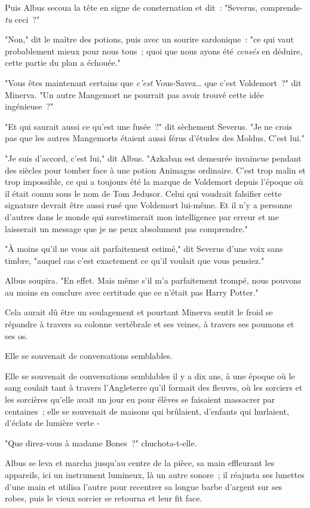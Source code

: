 Puis Albus secoua la tête en signe de consternation et dit~: "Severus, comprends-\emph{tu} ceci~?"

"Non," dit le maître des potions, puis avec un sourire sardonique~: "ce qui vaut probablement mieux pour nous tous~; quoi que nous ayons été \emph{censés} en déduire, cette partie du plan a échouée."

"Vous êtes maintenant certains que \emph{c'est} Vous-Savez… que c'est Voldemort~?" dit Minerva. "Un autre Mangemort ne pourrait pas avoir trouvé cette idée ingénieuse~?"

"Et qui saurait aussi ce qu'est une fusée~?" dit sèchement Severus. "Je ne crois pas que les autres Mangemorts étaient aussi férus d'études des Moldus. C'est lui."

"Je suis d'accord, c'est lui," dit Albus. "Azkaban est demeurée invaincue pendant des siècles pour tomber face à une potion Animagus ordinaire. C'est trop malin et trop impossible, ce qui a toujours été la marque de Voldemort depuis l'époque où il était connu sous le nom de Tom Jedusor. Celui qui voudrait falsifier cette signature devrait être aussi rusé que Voldemort lui-même. Et il n'y a personne d'autres dans le monde qui surestimerait mon intelligence par erreur et me laisserait un message que je ne peux absolument pas comprendre."

"À moins qu'il ne vous ait parfaitement estimé," dit Severus d'une voix sans timbre, "auquel cas c'est exactement ce qu'il voulait que vous pensiez."

Albus soupira. "En effet. Mais même s'il m'a parfaitement trompé, nous pouvons au moins en conclure avec certitude que ce n'était pas Harry Potter."

Cela aurait dû être un soulagement et pourtant Minerva sentit le froid se répandre à travers sa colonne vertébrale et ses veines, à travers ses poumons et ses os.

Elle se souvenait de conversations semblables.

Elle se souvenait de conversations semblables il y a dix ans, à une époque où le sang coulait tant à travers l'Angleterre qu'il formait des fleuves, où les sorciers et les sorcières qu'elle avait un jour eu pour élèves se faisaient massacrer par centaines~; elle se souvenait de maisons qui brûlaient, d'enfants qui hurlaient, d'éclats de lumière verte -

"Que direz-vous à madame Bones~?" chuchota-t-elle.

Albus se leva et marcha jusqu'au centre de la pièce, sa main effleurant les appareils, ici un instrument lumineux, là un autre sonore~; il réajusta ses lunettes d'une main et utilisa l'autre pour recentrer sa longue barbe d'argent sur ses robes, puis le vieux sorcier se retourna et leur fit face.

